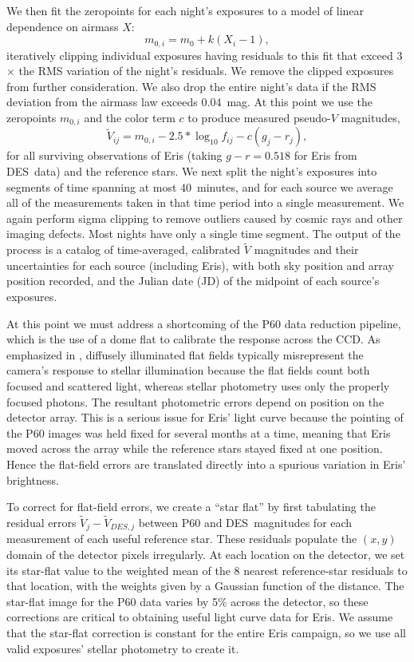 \documentclass[onecolumn]{aastex631}
\newcommand{\des}{DES}
\begin{document}
We then fit the zeropoints for each night's exposures to a model of linear dependence on airmass $X$:
\begin{equation}
  m_{0,i} = m_0 + k (X_i-1),
\end{equation}
iteratively clipping individual exposures having residuals to this fit that exceed 3$\times$ the RMS variation of the night's residuals. We remove the clipped exposures from further consideration. We also drop the entire night's data if the RMS deviation from the airmass law exceeds 0.04~mag.
At this point we use the zeropoints $m_{0,i}$ and the color term $c$ to produce measured pseudo-$V$ magnitudes,
\begin{equation}
  \tilde V_{ij} = m_{0,i} - 2.5 * \log_{10} f_{ij} - c(g_j-r_j),
\end{equation}
for all surviving observations of Eris (taking $g-r=0.518$ for Eris from \des\ data) and the reference stars. We next split the night's exposures into segments of time spanning at most 40~minutes, and for each source we average all of the measurements taken in that time period into a single measurement.  We again perform sigma clipping to remove outliers caused by cosmic rays and other imaging defects. Most nights have only a single time segment. The output of the process is a catalog of time-averaged, calibrated $\tilde V$ magnitudes and their uncertainties for each source (including Eris), with both sky position and array position recorded, and the Julian date (JD) of the midpoint of each source's exposures.

At this point we must address a shortcoming of the P60 data reduction pipeline, which is the use of a dome flat to calibrate the response across the CCD. As emphasized in \citet{decamphot}, diffusely illuminated flat fields typically misrepresent the camera's response to stellar illumination because the flat fields count both focused and scattered light, whereas stellar photometry uses only the properly focused photons. The resultant photometric errors depend on position on the detector array. This is a serious issue for Eris' light curve because the pointing of the P60 images was held fixed for several months at a time, meaning that Eris moved across the array while the reference stars stayed fixed at one position.  Hence the flat-field errors are translated directly into a spurious variation in Eris' brightness.

To correct for flat-field errors, we create a ``star flat'' by first tabulating the residual errors $\tilde V_j-\tilde V_{DES,j}$ between P60 and \des\ magnitudes for each measurement of each useful reference star. These residuals populate the $(x,y)$ domain of the detector pixels irregularly. At each location on the detector, we set its star-flat value to the weighted mean of the 8 nearest reference-star residuals to that location, with the weights given by a Gaussian function of the distance. The star-flat image for the P60 data varies by 5\% across the detector, so these corrections are critical to obtaining useful light curve data for Eris. We assume that the star-flat correction is constant for the entire Eris campaign, so we use all valid exposures' stellar photometry to create it.
\end{document}

